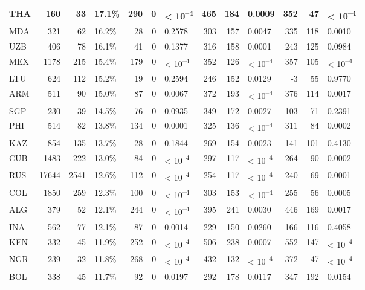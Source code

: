 \begin{tabular}{l|r|r|l|r|r|l|r|r|l|r|r|l}
\hline
THA & 160 & 33 & 17.1\% & 290 & 0 & < 10\textsuperscript{--4} & 465 & 184 & 0.0009 & 352 & 47 & < 10\textsuperscript{--4}\\
\hline
MDA & 321 & 62 & 16.2\% & 28 & 0 & 0.2578 & 303 & 157 & 0.0047 & 335 & 118 & 0.0010\\
\hline
UZB & 406 & 78 & 16.1\% & 41 & 0 & 0.1377 & 316 & 158 & 0.0001 & 243 & 125 & 0.0984\\
\hline
MEX & 1178 & 215 & 15.4\% & 179 & 0 & < 10\textsuperscript{--4} & 352 & 126 & < 10\textsuperscript{--4} & 357 & 105 & < 10\textsuperscript{--4}\\
\hline
LTU & 624 & 112 & 15.2\% & 19 & 0 & 0.2594 & 246 & 152 & 0.0129 & -3 & 55 & 0.9770\\
\hline
ARM & 511 & 90 & 15.0\% & 87 & 0 & 0.0067 & 372 & 193 & < 10\textsuperscript{--4} & 376 & 114 & 0.0017\\
\hline
SGP & 230 & 39 & 14.5\% & 76 & 0 & 0.0935 & 349 & 172 & 0.0027 & 103 & 71 & 0.2391\\
\hline
PHI & 514 & 82 & 13.8\% & 134 & 0 & 0.0001 & 325 & 136 & < 10\textsuperscript{--4} & 311 & 84 & 0.0002\\
\hline
KAZ & 854 & 135 & 13.7\% & 28 & 0 & 0.1844 & 269 & 154 & 0.0023 & 141 & 101 & 0.4130\\
\hline
CUB & 1483 & 222 & 13.0\% & 84 & 0 & < 10\textsuperscript{--4} & 297 & 117 & < 10\textsuperscript{--4} & 264 & 90 & 0.0002\\
\hline
RUS & 17644 & 2541 & 12.6\% & 112 & 0 & < 10\textsuperscript{--4} & 254 & 117 & < 10\textsuperscript{--4} & 240 & 69 & 0.0001\\
\hline
COL & 1850 & 259 & 12.3\% & 100 & 0 & < 10\textsuperscript{--4} & 303 & 153 & < 10\textsuperscript{--4} & 255 & 56 & 0.0005\\
\hline
ALG & 379 & 52 & 12.1\% & 244 & 0 & < 10\textsuperscript{--4} & 395 & 241 & 0.0030 & 446 & 169 & 0.0017\\
\hline
INA & 562 & 77 & 12.1\% & 87 & 0 & 0.0014 & 229 & 150 & 0.0260 & 166 & 116 & 0.4058\\
\hline
KEN & 332 & 45 & 11.9\% & 252 & 0 & < 10\textsuperscript{--4} & 506 & 238 & 0.0007 & 552 & 147 & < 10\textsuperscript{--4}\\
\hline
NGR & 239 & 32 & 11.8\% & 268 & 0 & < 10\textsuperscript{--4} & 432 & 132 & < 10\textsuperscript{--4} & 372 & 47 & < 10\textsuperscript{--4}\\
\hline
BOL & 338 & 45 & 11.7\% & 92 & 0 & 0.0197 & 292 & 178 & 0.0117 & 347 & 192 & 0.0154\\

\end{tabular}
